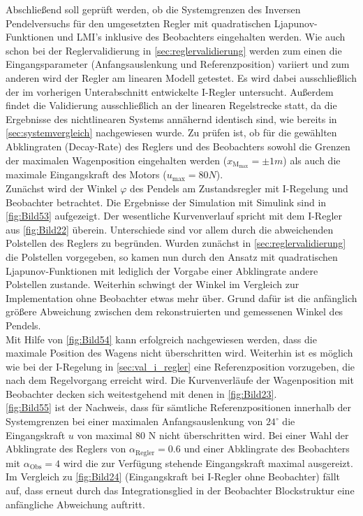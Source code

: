 Abschließend soll geprüft werden, ob die Systemgrenzen des Inversen Pendelversuchs für den umgesetzten Regler mit quadratischen Ljapunov-Funktionen und LMI's inklusive des Beobachters eingehalten werden. Wie auch schon bei der Reglervalidierung in \autoref{sec:reglervalidierung} werden zum einen die Eingangsparameter (Anfangsauslenkung und Referenzposition) variiert und zum anderen wird der Regler am linearen Modell getestet. Es wird dabei ausschließlich der im vorherigen Unterabschnitt entwickelte I-Regler untersucht. Außerdem findet die Validierung ausschließlich an der linearen Regelstrecke statt, da die Ergebnisse des nichtlinearen Systems annähernd identisch sind, wie bereits in \autoref{sec:systemvergleich} nachgewiesen wurde. Zu prüfen ist, ob für die gewählten Abklingraten (Decay-Rate) des Reglers und des Beobachters sowohl die Grenzen der maximalen Wagenposition eingehalten werden ($ x_{\mathrm{M_{max}}} = \pm 1 m$) als auch die maximale Eingangskraft des Motors ($u_{\mathrm{max}} = 80 N$).\\
\newline
Zunächst wird der Winkel $\varphi$ des Pendels am Zustandsregler mit I-Regelung und Beobachter betrachtet. Die Ergebnisse der Simulation mit Simulink sind in \autoref{fig:Bild53} aufgezeigt. Der wesentliche Kurvenverlauf spricht mit dem I-Regler aus \autoref{fig:Bild22} überein. Unterschiede sind vor allem durch die abweichenden Polstellen des Reglers zu begründen. Wurden zunächst in \autoref{sec:reglervalidierung} die Polstellen vorgegeben, so kamen nun durch den Ansatz mit quadratischen Ljapunov-Funktionen mit lediglich der Vorgabe einer Abklingrate andere Polstellen zustande. Weiterhin schwingt der Winkel im Vergleich zur Implementation ohne Beobachter etwas mehr über. Grund dafür ist die anfänglich größere Abweichung zwischen dem rekonstruierten und gemessenen Winkel des Pendels. \\
\newline
Mit Hilfe von \autoref{fig:Bild54} kann erfolgreich nachgewiesen werden, dass die maximale Position des Wagens nicht überschritten wird. Weiterhin ist es möglich wie bei der I-Regelung in \autoref{sec:val_i_regler} eine Referenzposition vorzugeben, die nach dem Regelvorgang erreicht wird. Die Kurvenverläufe der Wagenposition mit Beobachter decken sich weitestgehend mit denen in \autoref{fig:Bild23}. \\
\newline
\autoref{fig:Bild55} ist der Nachweis, dass für sämtliche Referenzpositionen innerhalb der Systemgrenzen bei einer maximalen Anfangsauslenkung von $24^\circ$ die Eingangskraft $u$ von maximal 80 N nicht überschritten wird. Bei einer Wahl der Abklingrate des Reglers von $\alpha_{\mathrm{Regler}} = 0.6$ und einer Abklingrate des Beobachters mit $\alpha_{\mathrm{Obs}} = 4$ wird die zur Verfügung stehende Eingangskraft maximal ausgereizt. Im Vergleich zu \autoref{fig:Bild24} (Eingangskraft bei I-Regler ohne Beobachter) fällt auf, dass erneut durch das Integrationsglied in der Beobachter Blockstruktur eine anfängliche Abweichung auftritt.

